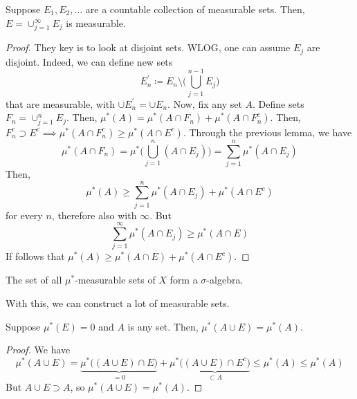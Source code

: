   \begin{theorem}
    Suppose $E_1, E_2, \ldots$ are a countable collection of measurable sets. Then, $E = \cup_{j=1}^\infty E_j$ is measurable. 
  \end{theorem}
  \begin{proof}
    They key is to look at disjoint sets. WLOG, one can assume $E_j$ are disjoint. Indeed, we can define new sets 
    \begin{equation}
      E_n^\prime \coloneqq E_n \setminus \bigg( \bigcup_{j=1}^{n-1} E_j \bigg) 
    \end{equation}
    that are measurable, with $\cup E_n^\prime = \cup E_n$. Now, fix any set $A$. Define sets $F_n = \cup_{j=1}^n E_j$. Then, $\mu^\ast (A) = \mu^\ast (A \cap F_n) + \mu^\ast (A \cap F_n^c)$. Then, $F_n^c \supset E^c \implies \mu^\ast (A \cap F_n^c) \geq \mu^\ast (A \cap E^c)$. Through the previous lemma, we have 
    \begin{equation}
      \mu^\ast (A \cap F_n) = \mu^\ast \bigg( \bigcup_{j=1}^n (A \cap E_j) \bigg) = \sum_{j=1}^n \mu^\ast (A \cap E_j) 
    \end{equation}
    Then, 
    \begin{equation}
      \mu^\ast (A) \geq \sum_{j=1}^n \mu^\ast (A \cap E_j) + \mu^\ast (A \cap E^c) 
    \end{equation}
    for every $n$, therefore also with $\infty$. But 
    \begin{equation}
      \sum_{j=1}^\infty \mu^\ast (A \cap E_j) \geq \mu^\ast (A \cap E)
    \end{equation}
    If follows that $\mu^\ast (A) \geq \mu^\ast (A \cap E) + \mu^\ast (A \cap E^c)$. 
  \end{proof}

  \begin{corollary}
    The set of all $\mu^\ast$-measurable sets of $X$ form a $\sigma$-algebra. 
  \end{corollary}

  With this, we can construct a lot of measurable sets. 

  \begin{lemma}
    Suppose $\mu^\ast (E) = 0$ and $A$ is any set. Then, $\mu^\ast (A \cup E) = \mu^\ast (A)$. 
  \end{lemma}
  \begin{proof}
    We have 
    \begin{equation}
      \mu^\ast (A \cup E) = \underbrace{\mu^\ast \big( (A \cup E) \cap E \big)}_{=0} + \mu^\ast \underbrace{\big( (A \cup E) \cap E^c \big)}_{\subset A} \leq \mu^\ast (A) \leq \mu^\ast (A)
    \end{equation}
    But $A \cup E \supset A$, so $\mu^\ast (A \cup E) = \mu^\ast (A)$. 
  \end{proof}

